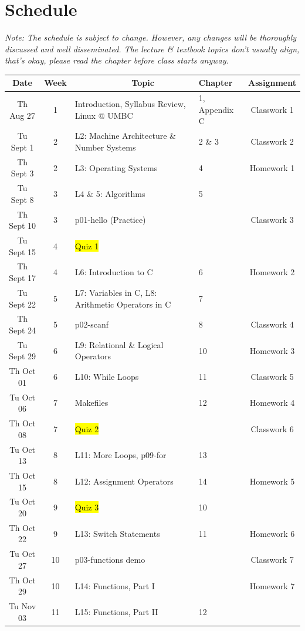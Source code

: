 \documentclass[letter,11pt]{article}
\begin{document}
\section*{Schedule}
\textit{Note: The schedule is subject to change. However, any changes will be thoroughly discussed and well disseminated. The lecture \& textbook topics don't usually align, that's okay, please read the chapter before class starts anyway.}

\small
\begin{tabular}{c c l l c}
Date & Week & ~~~~~~~~~~~~Topic & Chapter & Assignment \\
\hline
Th Aug 27  & 1 & Introduction, Syllabus Review, Linux @ UMBC & 1, Appendix C & Classwork 1  \\ \hline
Tu Sept 1  & 2 & L2: Machine Architecture \& Number Systems & 2 \& 3 & Classwork 2 \\
Th Sept 3  & 2 & L3: Operating Systems & 4 & Homework 1 \\
Tu Sept 8  & 3 & L4 \& 5: Algorithms & 5 & \\
Th Sept 10 & 3 & p01-hello (Practice) & & Classwork 3  \\
Tu Sept 15 & 4 & \hl{Quiz 1} & &  \\
Th Sept 17 & 4 & L6: Introduction to C & 6 & Homework 2 \\
Tu Sept 22 & 5 & L7: Variables in C, L8: Arithmetic Operators in C & 7 \\
Th Sept 24 & 5 & p02-scanf & 8 & Classwork 4 \\
Tu Sept 29 & 6 & L9: Relational \& Logical Operators & 10 & Homework 3 \\ \hline
Th Oct  01 & 6 & L10: While Loops & 11 & Classwork 5 \\
Tu Oct 06 & 7 & Makefiles & 12 & Homework 4 \\
Th Oct 08 & 7 & \hl{Quiz 2} & & Classwork 6 \\
Tu Oct 13 & 8 & L11: More Loops, p09-for & 13 & \\
Th Oct 15 & 8 & L12: Assignment Operators & 14 & Homework 5 \\
Tu Oct 20 & 9 & \hl{Quiz 3} & 10 \\
Th Oct 22 & 9 & L13: Switch Statements & 11 & Homework 6 \\
Tu Oct 27 & 10 & p03-functions demo   & & Classwork 7 \\
Th Oct 29 & 10 & L14: Functions, Part I   & & Homework 7\\ \hline
Tu Nov 03 & 11 & L15: Functions, Part II  & 12 \\

\end{tabular}
\end{document}
